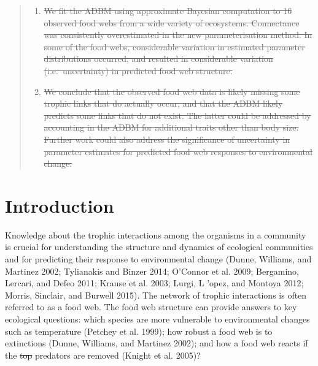 \documentclass{article}
\providecommand{\DIFaddtex}[1]{{\protect\color{blue}\uwave{#1}}} %
\providecommand{\DIFdeltex}[1]{{\protect\color{red}\sout{#1}}}                      %
\providecommand{\DIFaddbegin}{} %
\providecommand{\DIFaddend}{} %
\providecommand{\DIFdelbegin}{} %
\providecommand{\DIFdelend}{} %
\providecommand{\DIFadd}[1]{\texorpdfstring{\DIFaddtex{#1}}{#1}} %
\providecommand{\DIFdel}[1]{\texorpdfstring{\DIFdeltex{#1}}{}} %
\newcommand{\DIFscaledelfig}{0.5}
\newlength{\DIFdelgraphicswidth} %
\newlength{\DIFdelgraphicsheight} %
\newcommand{\DIFaddincludegraphics}[2][]{{\color{blue}\fbox{\DIFOincludegraphics[#1]{#2}}}} %
\newcommand{\DIFdelincludegraphics}[2][]{%
\sbox{\DIFdelgraphicsbox}{\DIFOincludegraphics[#1]{#2}}%
\settoboxwidth{\DIFdelgraphicswidth}{\DIFdelgraphicsbox} %
\settoboxtotalheight{\DIFdelgraphicsheight}{\DIFdelgraphicsbox} %
\scalebox{\DIFscaledelfig}{%
\parbox[b]{\DIFdelgraphicswidth}{\usebox{\DIFdelgraphicsbox}\\[-\baselineskip] \rule{\DIFdelgraphicswidth}{0em}}\llap{\resizebox{\DIFdelgraphicswidth}{\DIFdelgraphicsheight}{%
\setlength{\unitlength}{\DIFdelgraphicswidth}%
\begin{picture}(1,1)%
\thicklines\linethickness{2pt} %
{\color[rgb]{1,0,0}\put(0,0){\framebox(1,1){}}}%
{\color[rgb]{1,0,0}\put(0,0){\line( 1,1){1}}}%
{\color[rgb]{1,0,0}\put(0,1){\line(1,-1){1}}}%
\end{picture}%
}\hspace*{3pt}}} %
} %
\DeclareRobustCommand{\DIFaddbegin}{\DIFOaddbegin \let\includegraphics\DIFaddincludegraphics} %
\DeclareRobustCommand{\DIFaddend}{\DIFOaddend \let\includegraphics\DIFOincludegraphics} %
\DeclareRobustCommand{\DIFdelbegin}{\DIFOdelbegin \let\includegraphics\DIFdelincludegraphics} %
\DeclareRobustCommand{\DIFdelend}{\DIFOaddend \let\includegraphics\DIFOincludegraphics} %
\begin{document}
\begin{abstract}
\begin{enumerate}
\item%
\DIFdel{We fit the ADBM using approximate Bayesian computation to 16 observed
  food webs from a wide variety of ecosystems. Connectance was
  consistently overestimated in the new parameterisation method. In some
  of the food webs, considerable variation in estimated parameter
  distributions occurred, and resulted in considerable variation
  (i.e.~uncertainty) in predicted food web structure.
}%
\item%
\DIFdel{We conclude that the observed food web data is likely missing some
  trophic links that do actually occur, and that the ADBM likely
  predicts some links that do not exist. The latter could be addressed
  by accounting in the ADBM for additional traits other than body size.
  Further work could also address the significance of uncertainty in
  parameter estimates for predicted food web responses to environmental
  change.
}\DIFdelend \end{enumerate}
\end{abstract}


\hypertarget{introduction}{%
\section{Introduction}\label{introduction}}

Knowledge about the trophic interactions among the organisms in a
community is crucial for understanding the structure and dynamics of
ecological communities and for predicting their response to
environmental change (Dunne, Williams, and Martinez 2002; Tylianakis and
Binzer 2014; O'Connor et al. 2009; Bergamino, Lercari, and Defeo 2011;
Krause et al. 2003; Lurgi, L\DIFdelbegin %
\DIFdelend 'opez, and Montoya 2012; Morris, Sinclair,
and Burwell 2015). The network of trophic interactions is often referred
to as a food web. The food web structure can provide answers to key
ecological questions: which species are more vulnerable to environmental
changes such as temperature (\DIFaddbegin \DIFadd{Owen L. }\DIFaddend Petchey et al. 1999); how robust a
food web is to extinctions (Dunne, Williams, and Martinez 2002); and how
a food web reacts if the \DIFdelbegin \DIFdel{top }\DIFdelend predators are removed (Knight et al. 2005)?
\end{document}
